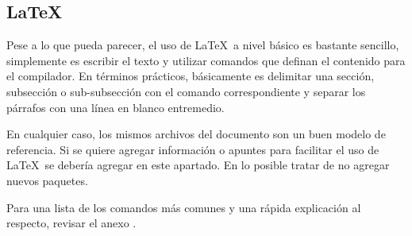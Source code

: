 
\subsection{LaTeX}\label{flujo:latex}
Pese a lo que pueda parecer, el uso de \LaTeX\ a nivel básico es bastante sencillo, simplemente es escribir el texto y utilizar comandos que definan el contenido para el compilador. En términos prácticos, básicamente es delimitar una sección, subsección o sub-subsección con el comando correspondiente y separar los párrafos con una línea en blanco entremedio.

En cualquier caso, los mismos archivos  del documento son un buen modelo de referencia. Si se quiere agregar información o apuntes para facilitar el uso de \LaTeX\ se debería agregar en este apartado. En lo posible tratar de no agregar nuevos paquetes.

Para una lista de los comandos más comunes y una rápida explicación al respecto, revisar el anexo .
